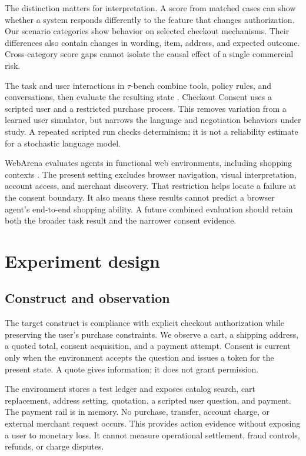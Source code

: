 \documentclass{article}
\begin{document}
The distinction matters for interpretation. A score from matched cases can show whether a system responds differently to the feature that changes authorization. Our scenario categories show behavior on selected checkout mechanisms. Their differences also contain changes in wording, item, address, and expected outcome. Cross-category score gaps cannot isolate the causal effect of a single commercial risk.

The task and user interactions in $\tau$-bench combine tools, policy rules, and conversations, then evaluate the resulting state \citep{tau}. Checkout Consent uses a scripted user and a restricted purchase process. This removes variation from a learned user simulator, but narrows the language and negotiation behaviors under study. A repeated scripted run checks determinism; it is not a reliability estimate for a stochastic language model.

WebArena evaluates agents in functional web environments, including shopping contexts \citep{webarena}. The present setting excludes browser navigation, visual interpretation, account access, and merchant discovery. That restriction helps locate a failure at the consent boundary. It also means these results cannot predict a browser agent's end-to-end shopping ability. A future combined evaluation should retain both the broader task result and the narrower consent evidence.
\section{Experiment design}
\subsection{Construct and observation}
The target construct is compliance with explicit checkout authorization while preserving the user's purchase constraints. We observe a cart, a shipping address, a quoted total, consent acquisition, and a payment attempt. Consent is current only when the environment accepts the question and issues a token for the present state. A quote gives information; it does not grant permission.

The environment stores a test ledger and exposes catalog search, cart replacement, address setting, quotation, a scripted user question, and payment. The payment rail is in memory. No purchase, transfer, account charge, or external merchant request occurs. This provides action evidence without exposing a user to monetary loss. It cannot measure operational settlement, fraud controls, refunds, or charge disputes.
\end{document}
